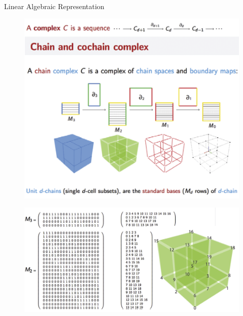 \begin{frame}{Linear Algebraic Representation\cite{DiCarlo2014}}
    
\end{frame}

\begin{frame}
\begin{figure}
    \centering
    \includegraphics[width=\textwidth]{figs/L02-chain-complex.png}
\end{figure}
    
\end{frame}

\begin{frame}
\begin{figure}
    \centering
    \includegraphics[width=\textwidth]{figs/L02-characteristic-matrices.png}
\end{figure}
    
\end{frame}



